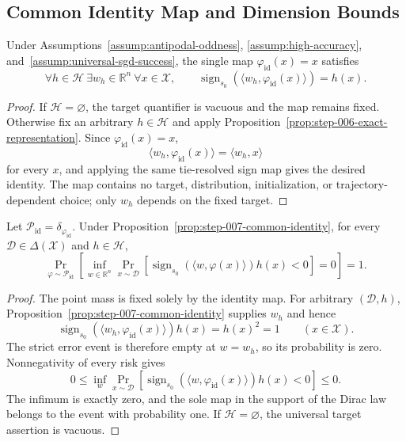 \subsection{Common Identity Map and Dimension Bounds}
\label{app:dimension-closure}

\begin{proposition}
\label{prop:step-007-common-identity}
Under Assumptions~\ref{assump:antipodal-oddness},
\ref{assump:high-accuracy}, and~\ref{assump:universal-sgd-success}, the
single map $\varphi_{\mathrm{id}}(x)=x$ satisfies
\[
\forall h\in\mathcal H\ \exists w_h\in\mathbb R^n\ \forall x\in\mathcal X,
\qquad
\operatorname{sign}_{s_0}(\langle w_h,\varphi_{\mathrm{id}}(x)\rangle)=h(x).
\]
\end{proposition}

\begin{proof}
If $\mathcal H=\varnothing$, the target quantifier is vacuous and the map
remains fixed.  Otherwise fix an arbitrary $h\in\mathcal H$ and apply
Proposition~\ref{prop:step-006-exact-representation}.  Since
$\varphi_{\mathrm{id}}(x)=x$,
\[
\langle w_h,\varphi_{\mathrm{id}}(x)\rangle=\langle w_h,x\rangle
\]
for every $x$, and applying the same tie-resolved sign map gives the desired
identity.  The map contains no target, distribution, initialization, or
trajectory-dependent choice; only $w_h$ depends on the fixed target.
\end{proof}

\begin{proposition}
\label{prop:step-007-point-mass}
Let $\mathcal P_{\mathrm{id}}=\delta_{\varphi_{\mathrm{id}}}$.  Under
Proposition~\ref{prop:step-007-common-identity}, for every
$\mathcal D\in\Delta(\mathcal X)$ and $h\in\mathcal H$,
\[
\Pr_{\varphi\sim\mathcal P_{\mathrm{id}}}\!\left[
\inf_{w\in\mathbb R^n}\Pr_{x\sim\mathcal D}\!\left[
\operatorname{sign}_{s_0}(\langle w,\varphi(x)\rangle)h(x)<0
\right]=0\right]=1.
\]
\end{proposition}

\begin{proof}
The point mass is fixed solely by the identity map.  For arbitrary
$(\mathcal D,h)$, Proposition~\ref{prop:step-007-common-identity} supplies
$w_h$ and hence
\[
\operatorname{sign}_{s_0}(\langle w_h,\varphi_{\mathrm{id}}(x)\rangle)h(x)
=h(x)^2=1
\qquad(x\in\mathcal X).
\]
The strict error event is therefore empty at $w=w_h$, so its probability is
zero.  Nonnegativity of every risk gives
\[
0\leq\inf_w\Pr_{x\sim\mathcal D}
 [\operatorname{sign}_{s_0}(\langle w,\varphi_{\mathrm{id}}(x)\rangle)h(x)<0]
\leq0.
\]
The infimum is exactly zero, and the sole map in the support of the Dirac law
belongs to the event with probability one.  If $\mathcal H=\varnothing$,
the universal target assertion is vacuous.
\end{proof}

